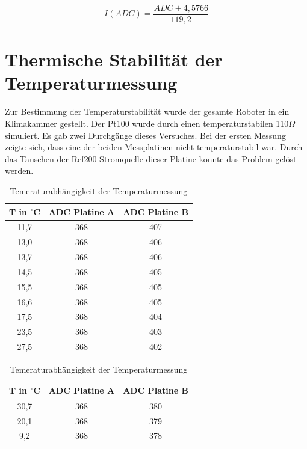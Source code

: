 \documentclass[a4paper,bibtotoc,oneside]{scrbook}
\begin{document}
\begin{equation}
     I(ADC) = \frac{ADC + 4,5766} {119,2} 
\end{equation}
  


\section{Thermische Stabilität der Temperaturmessung}\thispagestyle{empty}
Zur Bestimmung der Temperaturstabilität wurde der gesamte Roboter in ein Klimakammer gestellt. Der Pt100 wurde durch einen temperaturstabilen 110$\Omega$ simuliert.
Es gab zwei Durchgänge dieses Versuches.
Bei der ersten Messung zeigte sich, dass eine der beiden Messplatinen nicht temperaturstabil war. Durch das Tauschen der Ref200 Stromquelle dieser Platine konnte das Problem gelöst werden.

\begin{table}[htbp]
\centering
\begin{tabular}{ | c | c | c |}\hline
{\bf T in $^{\circ}$C} & {\bf ADC Platine A} & {\bf ADC Platine B}\\ \hline
\hline
11,7 & 368 & 407\\ \hline
13,0 & 368 & 406\\ \hline
13,7 & 368 & 406\\ \hline
14,5 & 368 & 405\\ \hline
15,5 & 368 & 405\\ \hline
16,6 & 368 & 405\\ \hline
17,5 & 368 & 404\\ \hline
23,5 & 368 & 403\\ \hline
27,5 & 368 & 402\\ \hline
\end{tabular}
\caption{Temeraturabhängigkeit der Temperaturmessung}\label{TabT1}
\end{table}

\begin{table}[htbp]
\centering
\begin{tabular}{ | c | c | c |}\hline
{\bf T in $^{\circ}$C} & {\bf ADC Platine A} & {\bf ADC Platine B}\\ \hline
\hline
30,7 & 368 & 380\\ \hline
20,1 & 368 & 379\\ \hline
9,2 & 368 & 378\\ \hline
\end{tabular}
\caption{Temeraturabhängigkeit der Temperaturmessung}\label{TabT1}
\end{table}
\end{document}
